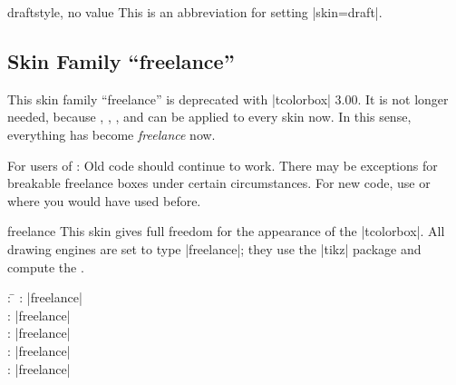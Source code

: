 \begin{docTcbKey}{draft}{}{style, no value}
  This is an abbreviation for setting |skin=draft|.
\end{docTcbKey}


\begin{dispExample}
\end{dispExample}



\begin{dispExample}
\vspace*{3mm}
\begin{tcolorbox}[draft,title=A colored box with the \enquote{draft} skin]
\lipsum[1-3]
\tcblower
\lipsum[4-6]
\end{tcolorbox}
\end{dispExample}



\clearpage
\subsection{Skin Family \enquote{freelance}}
\begin{marker}
This skin family \enquote{freelance} is deprecated with |tcolorbox| 3.00.
It is not longer needed, because
,
,
, and
can be applied to every skin now. In this sense, everything has become
\emph{freelance} now.\par
For users of : Old code should continue to work. There may be
exceptions for breakable freelance boxes under certain circumstances.
For new code, use  or  where
you would have used  before.
\end{marker}

\begin{docSkin}{freelance}
  This skin gives full freedom for the appearance of the |tcolorbox|.
  All drawing engines are set to type |freelance|; they use the |tikz| package
  and compute the .
\begin{tcolorbox}[skintable=freelance]
  \begin{tabbing}
    : \=\kill
    :           \> |freelance|\\
    : \> |freelance|\\ 
    :        \> |freelance|\\
    :    \> |freelance|\\
    :           \> |freelance|
  \end{tabbing}
\end{tcolorbox}
\end{docSkin}

